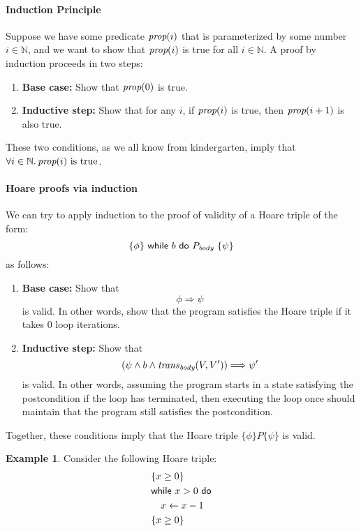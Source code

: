 \documentclass{amsart}
\theoremstyle{definition}
\newtheorem{example}[theorem]{Example}
\theoremstyle{remark}
\numberwithin{equation}{section}
\begin{document}
\paragraph{Induction Principle}
Suppose we have some predicate $\emph{prop}(i)$
that is parameterized by some number $i \in \mathbb{N}$,
and we want to show that $\emph{prop}(i)$ is true
for all $i \in \mathbb{N}$.
A proof by induction proceeds in two steps:
\begin{enumerate}
  \item \textbf{Base case:}
  Show that $\emph{prop}(0)$ is true.

  \item \textbf{Inductive step:}
  Show that for any $i$,
  if $\emph{prop}(i)$ is true, then $\emph{prop}(i+1)$
  is also true.
\end{enumerate}
These two conditions, as we all know from kindergarten,
imply that $\forall i \in \mathbb{N} \ldotp \emph{prop}(i) \text{ is true}$.

\paragraph{Hoare proofs via induction}
We can try to apply induction to the proof
of validity of a Hoare triple of the form:
$$\{\phi\}\ \whilest\  b\  \dost\  P_\body\  \{\psi\}$$
as follows:
\begin{enumerate}
  \item \textbf{Base case:}
  Show that
  $$\phi \Rightarrow \psi$$
  is valid.
  In other words, show that the program satisfies
  the Hoare triple if it takes 0 loop iterations.

  \item \textbf{Inductive step:}
  Show that
  $$(\psi \land b \land \mathit{trans}_{\emph{body}}(V,V')) \Longrightarrow  \psi'$$
  is valid.
  In other words, assuming the program starts
  in a state satisfying the postcondition if the loop has terminated,
  then executing the loop once should maintain
  that the program still satisfies the postcondition.
\end{enumerate}
Together, these conditions imply that
the Hoare triple $\{\phi\} P \{\psi\}$
is valid.

\begin{example}
  Consider the following Hoare triple:
  \begin{align*}
    &\{x \geq 0\} \\
    &\mathsf{while} ~ x > 0  ~ \mathsf{do}\\
    &\ \ \ x \gets x - 1\\
    &\{x \geq 0\}
  \end{align*}
\end{example}
\end{document}
